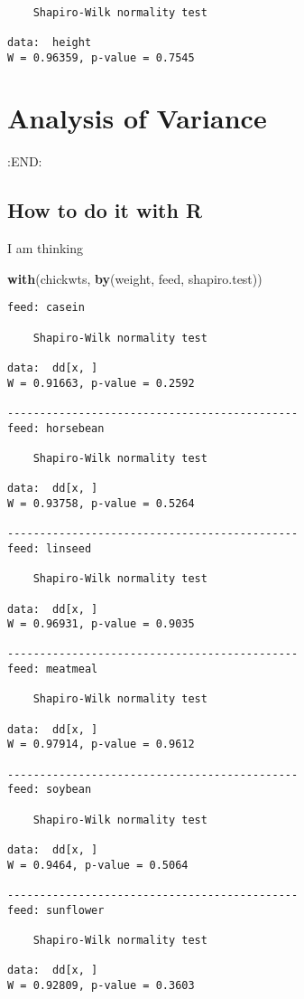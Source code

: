 \documentclass[]{book}
\newenvironment{Shaded}{\begin{snugshade}}{\end{snugshade}}
\newcommand{\KeywordTok}[1]{\textcolor[rgb]{0.13,0.29,0.53}{\textbf{{#1}}}}
\newcommand{\NormalTok}[1]{{#1}}
\numberwithin{equation}{chapter}
\numberwithin{figure}{chapter}
\theoremstyle{plain}
\theoremstyle{definition}
\theoremstyle{remark}
\theoremstyle{definition}
\theoremstyle{definition}
\theoremstyle{remark}
\begin{document}
\begin{verbatim}

    Shapiro-Wilk normality test

data:  height
W = 0.96359, p-value = 0.7545
\end{verbatim}

\section{Analysis of Variance}\label{sec-analysis-of-variance}

:END:

\subsection{How to do it with R}\label{how-to-do-it-with-r-45}

I am thinking

\begin{Shaded}
\begin{Highlighting}[]
\KeywordTok{with}\NormalTok{(chickwts, }\KeywordTok{by}\NormalTok{(weight, feed, shapiro.test))}
\end{Highlighting}
\end{Shaded}

\begin{verbatim}
feed: casein

    Shapiro-Wilk normality test

data:  dd[x, ]
W = 0.91663, p-value = 0.2592

--------------------------------------------- 
feed: horsebean

    Shapiro-Wilk normality test

data:  dd[x, ]
W = 0.93758, p-value = 0.5264

--------------------------------------------- 
feed: linseed

    Shapiro-Wilk normality test

data:  dd[x, ]
W = 0.96931, p-value = 0.9035

--------------------------------------------- 
feed: meatmeal

    Shapiro-Wilk normality test

data:  dd[x, ]
W = 0.97914, p-value = 0.9612

--------------------------------------------- 
feed: soybean

    Shapiro-Wilk normality test

data:  dd[x, ]
W = 0.9464, p-value = 0.5064

--------------------------------------------- 
feed: sunflower

    Shapiro-Wilk normality test

data:  dd[x, ]
W = 0.92809, p-value = 0.3603
\end{verbatim}
\end{document}

